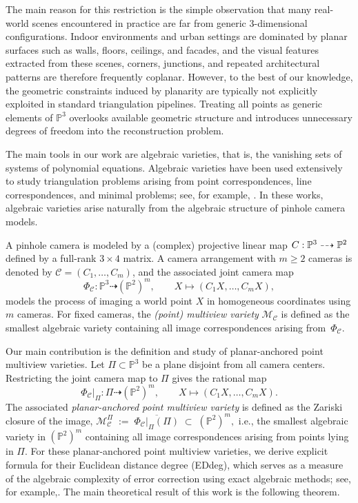 \documentclass{article}
\newcommand{\PP}{\mathbb{P}}
\begin{document}
The main reason for this restriction is the simple observation that many real-world scenes encountered in practice are far from generic 3-dimensional configurations. Indoor environments and urban settings are dominated by planar surfaces such as walls, floors, ceilings, and facades, and the visual features extracted from these scenes, corners, junctions, and repeated architectural patterns are therefore frequently coplanar\cite{Holz2018,Li2020}. However, to the best of our knowledge, the geometric constraints induced by planarity are typically not explicitly exploited in standard triangulation pipelines. Treating all points as generic elements of \( \PP^3 \) overlooks available geometric structure and introduces unnecessary degrees of freedom into the reconstruction problem.


The main tools in our work are algebraic varieties, that is, the vanishing sets of systems of polynomial equations. Algebraic varieties have been used extensively to study triangulation problems arising from point correspondences, line correspondences, and minimal problems; see, for example, \cite{agarwal2019ideals,breiding2022line,kileel2022snapshot,Kileel_Thesis,Duff20_partialvis}. In these works, algebraic varieties arise naturally from the algebraic structure
of pinhole camera models.

A pinhole camera is modeled by a (complex) projective linear map \mbox{\(C:\PP^3\dashrightarrow\nolinebreak\PP^2\)} defined by a full-rank \( 3 \times 4 \) matrix.
A camera arrangement with \( m \geq 2 \) cameras is denoted by
\( \mathcal{C} = (C_1,\dots,C_m) \), and the associated joint camera map
\[
\Phi_{\mathcal{C}} :
\PP^3 \dashrightarrow (\PP^2)^m,
\qquad
X \longmapsto (C_1X,\dots,C_mX),
\]
models the process of imaging a world point \( X \) in homogeneous coordinates using \( m \) cameras.
For fixed cameras, the \emph{(point) multiview variety} \(\mathcal{M}_{\mathcal{C}}\) is defined as the smallest algebraic variety containing all image correspondences arising from~\( \Phi_{\mathcal{C}} \).

Our main contribution is the definition and study of planar-anchored point multiview varieties. Let \( \Pi \subset \PP^3 \) be a plane disjoint from all camera centers. Restricting the joint camera map to \( \Pi \) gives the rational map
\[
\Phi_{\mathcal{C}}|_{\Pi} :
\Pi \dashrightarrow (\PP^2)^m,
\qquad
X \longmapsto (C_1X,\dots,C_mX).
\]
The associated \emph{planar-anchored point multiview variety} is defined as the Zariski closure of the image,
\(
\mathcal{M}^\Pi_{\mathcal{C}} \;:=\; \overline{\Phi_{\mathcal{C}}|_{\Pi}(\Pi)} \;\subset\; (\PP^2)^m,
\)
i.e., the smallest algebraic variety in \( (\PP^2)^m \) containing all image correspondences arising from
points lying in \( \Pi \).
For these planar-anchored point multiview varieties, we derive explicit formula for their Euclidean distance degree (EDdeg), which serves as a measure of the algebraic complexity of error correction using exact algebraic methods; see, for example,\cite{draisma2016euclidean,breiding2024metric}. The main theoretical result of this work is the following theorem.
\end{document}
